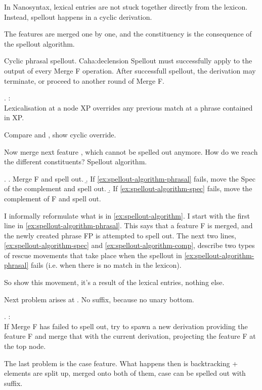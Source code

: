 In Nanosyntax, lexical entries are not stuck together directly from the lexicon. Instead, spellout happens in a cyclic derivation.

The features are merged one by one, and the constituency is the consequence of the spellout algorithm.

Cyclic phrasal spellout. Caha:declension
Spellout must successfully apply to the output of every Merge F operation. After successfull spellout, the derivation may terminate, or proceed to another round of Merge F.

\ex.  \citep{starke2018}:\\
Lexicalisation at a node XP overrides any previous match at a phrase contained in XP.

Compare  and , show cyclic override.

Now merge next feature , which cannot be spelled out anymore.  How do we reach the different constituents? Spellout algorithm.

\ex. \label{ex:spellout-algorithm}
 \a. Merge F and spell out.\label{ex:spellout-algorithm-phrasal}
 \b. If \ref{ex:spellout-algorithm-phrasal} fails, move the Spec of the complement and spell out.\label{ex:spellout-algorithm-spec}
 \b. If \ref{ex:spellout-algorithm-spec} fails, move the complement of F and spell out.\label{ex:spellout-algorithm-comp}

I informally reformulate what is in \ref{ex:spellout-algorithm}. I start with the first line in \ref{ex:spellout-algorithm-phrasal}. This says that a feature F is merged, and the newly created phrase FP is attempted to spell out.
The next two lines, \ref{ex:spellout-algorithm-spec} and \ref{ex:spellout-algorithm-comp}, describe two types of rescue movements that take place when the spellout in \ref{ex:spellout-algorithm-phrasal} fails (i.e. when there is no match in the lexicon).

So show this movement, it's a result of the lexical entries, nothing else.

Next problem arises at . No suffix, because no unary bottom.

\ex.  \citep{starke2018}:\\
If Merge F has failed to spell out, try to spawn a new derivation providing the feature F and merge that with the current derivation, projecting the feature F at the top node.\label{ex:specformation}

The last problem is the case feature. What happens then is backtracking + elements are split up, merged onto both of them, case can be spelled out with suffix.




